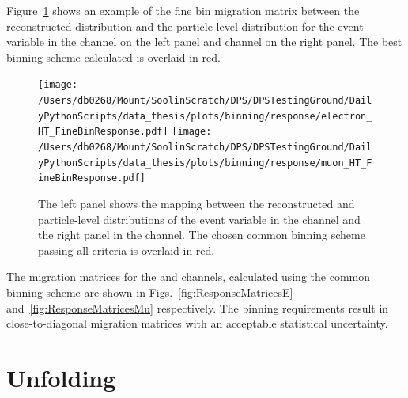 Figure~\ref{fig:finebinHT} shows an example of the fine bin migration matrix between the reconstructed distribution and the particle-level distribution for the \HT{} event variable in the \eJets{} channel on the left panel and \muJets{} channel on the right panel.
The best binning scheme calculated is overlaid in red.
\begin{figure}[htpb]
	\centering
	\texttt{[image: /Users/db0268/Mount/SoolinScratch/DPS/DPSTestingGround/DailyPythonScripts/data\_thesis/plots/binning/response/electron\_HT\_FineBinResponse.pdf]}
	\texttt{[image: /Users/db0268/Mount/SoolinScratch/DPS/DPSTestingGround/DailyPythonScripts/data\_thesis/plots/binning/response/muon\_HT\_FineBinResponse.pdf]}
	\caption[The left panel shows the mapping between the reconstructed and particle-level distributions of the \HT{} event variable in the \eJets{} channel and the right panel in the \muJets{} channel. The chosen common binning scheme passing all criteria is overlaid in red.]{The left panel shows the mapping between the reconstructed and particle-level distributions of the \HT{} event variable in the \eJets{} channel and the right panel in the \muJets{} channel. The chosen common binning scheme passing all criteria is overlaid in red.}
	\label{fig:finebinHT}
\end{figure}
The migration matrices for the \eJets{} and \muJets{} channels, calculated using the common binning scheme are shown in Figs.~\ref{fig:ResponseMatricesE} and~\ref{fig:ResponseMatricesMu} respectively.
The binning requirements result in close-to-diagonal migration matrices with an acceptable statistical uncertainty.




% 
% 

\section{Unfolding} %
\label{sec:unfolding}

